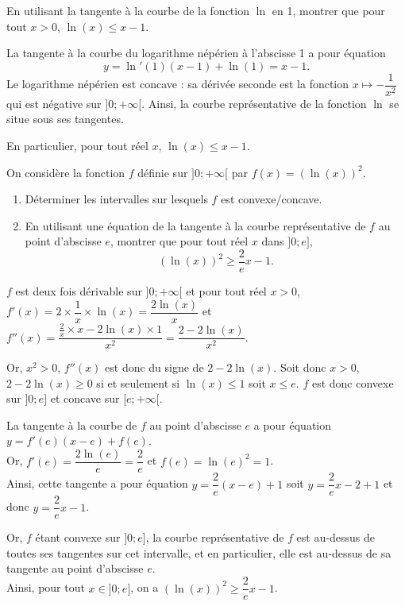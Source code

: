 \documentclass[11pt,fleqn, openany]{book} %
\begin{document}
\begin{exercise}[topic=cvx03]En utilisant la tangente à la courbe de la fonction $\ln$ en 1, montrer que pour tout $x>0$, $\ln(x) \leqslant x -1$.\end{exercise}

\begin{solution}
La tangente à la courbe du logarithme népérien à l'abscisse 1 a pour équation
\[ y =\ln'(1)(x-1)+\ln(1)=x-1.\]
Le logarithme népérien est concave : sa dérivée seconde est la fonction \(x\mapsto -\dfrac{1}{x^2}\) qui est négative sur \(]0;+\infty[\). Ainsi, la courbe représentative de la fonction \(\ln\) se situe sous ses tangentes.

En particulier, pour tout réel \(x\), \(\ln(x) \leqslant x-1\).\end{solution}



\begin{exercise}[topic=cvx03]On considère la fonction $f$ définie sur $]0;+\infty[$ par $f(x)=(\ln(x))^2$.
\begin{enumerate}
\item Déterminer les intervalles sur lesquels $f$ est convexe/concave.
\item En utilisant une équation de la tangente à la courbe représentative de $f$ au point d'abscisse $e$, montrer que pour tout réel $x$ dans $]0;e]$,
\[(\ln(x))^2\geqslant \dfrac{2}{e}x-1.\]
\end{enumerate}\end{exercise}

\begin{solution}
$f$ est deux fois dérivable sur $]0;+\infty[$ et pour tout réel $x>0$, $f'(x)=2  \times \dfrac{1}{x} \times \ln (x)= \dfrac{2\ln(x)}{x}$ et $f''(x)=\dfrac{\frac{2}{x}\times x - 2\ln(x) \times 1}{x^2}=\dfrac{2-2\ln(x)}{x^2}$.

Or, $x^2>0$, $f''(x)$ est donc du signe de $2-2\ln(x)$. Soit donc $x>0$, $2-2\ln(x) \geqslant 0$ si et seulement si $\ln(x) \leqslant 1$ soit $x\leqslant e$. $f$ est donc convexe sur $]0;e]$ et concave sur $[e;+\infty[$.

La tangente à la courbe de $f$ au point d'abscisse $e$ a pour équation $y=f'(e)(x-e)+f(e)$. \\Or, $f'(e)=\dfrac{2\ln(e)}{e}=\dfrac{2}{e}$ et $f(e)=\ln(e)^2=1$. \\Ainsi, cette tangente a pour équation $y=\dfrac{2}{e}(x-e)+1$ soit $y=\dfrac{2}{e}x-2+1$ et donc $y=\dfrac{2}{e}x-1$. 

Or, $f$ étant convexe sur $]0;e]$, la courbe représentative de $f$ est au-dessus de toutes ses tangentes sur cet intervalle, et en particulier, elle est au-dessus de sa tangente au point d'abscisse $e$. \\ Ainsi, pour tout $x\in]0;e]$, on a $(\ln(x))^2 \geqslant \dfrac{2}{e}x-1$.\end{solution}
\end{document}
